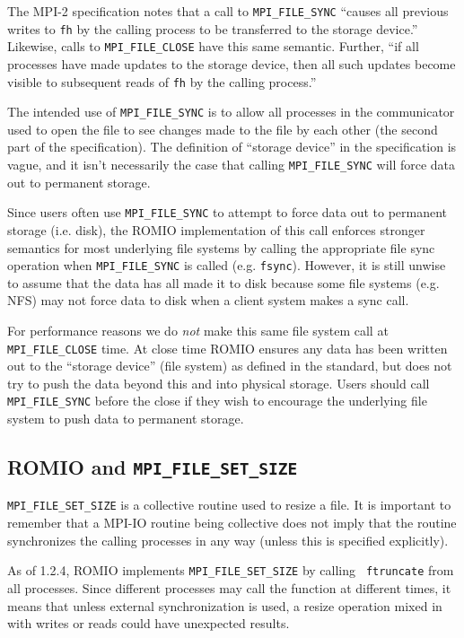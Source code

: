 The MPI-2 specification notes that a call to {\tt MPI\_FILE\_SYNC} ``causes
all previous writes to {\tt fh} by the calling process to be transferred to
the storage device.''  Likewise, calls to {\tt MPI\_FILE\_CLOSE} have this
same semantic.  Further, ``if all processes have made updates to the storage
device, then all such updates become visible to subsequent reads of {\tt fh}
by the calling process.''

The intended use of {\tt MPI\_FILE\_SYNC} is to allow all processes in the
communicator used to open the file to see changes made to the file by each
other (the second part of the specification).  The definition of ``storage
device'' in the specification is vague, and it isn't necessarily the case that
calling {\tt MPI\_FILE\_SYNC} will force data out to permanent storage.

Since users often use {\tt MPI\_FILE\_SYNC} to attempt to force data out to
permanent storage (i.e. disk), the ROMIO implementation of this call enforces
stronger semantics for most underlying file systems by calling the appropriate
file sync operation when {\tt MPI\_FILE\_SYNC} is called (e.g. {\tt fsync}).
However, it is still unwise to assume that the data has all made it to disk
because some file systems (e.g. NFS) may not force data to disk when a client
system makes a sync call.

For performance reasons we do \emph{not} make this same file system call at
{\tt MPI\_FILE\_CLOSE} time.  At close time ROMIO ensures any data has been
written out to the ``storage device'' (file system) as defined in the
standard, but does not try to push the data beyond this and into physical
storage. Users should call {\tt MPI\_FILE\_SYNC} before the close if they wish
to encourage the underlying file system to push data to permanent storage.

\subsection{ROMIO and {\tt MPI\_FILE\_SET\_SIZE}}

{\tt MPI\_FILE\_SET\_SIZE} is a collective routine used to resize a file.  It
is important to remember that a MPI-IO routine being collective does not imply
that the routine synchronizes the calling processes in any way (unless this is
specified explicitly).

As of 1.2.4, ROMIO implements {\tt MPI\_FILE\_SET\_SIZE} by calling {\tt
ftruncate} from all processes.  Since different processes may call the
function at different times, it means that unless external synchronization is
used, a resize operation mixed in with writes or reads could have unexpected
results.

